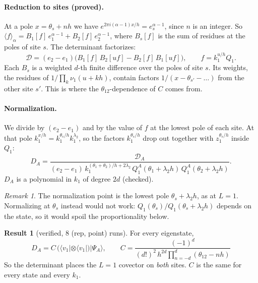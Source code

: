 \documentclass[11pt]{article}
\theoremstyle{definition}
\newtheorem{result}{Result}
\theoremstyle{remark}
\newtheorem*{remark}{Remark}
\begin{document}
\paragraph{Reduction to sites (proved).}
At a pole $x=\theta_s+nh$ we have $e^{2\pi i(\alpha-1)x/h}=e_s^{\alpha-1}$, since $n$ is an integer. So $\langle f\rangle_\alpha=B_1[f]\,e_1^{\alpha-1}+B_2[f]\,e_2^{\alpha-1}$, where $B_s[f]$ is the sum of residues at the poles of site $s$. The determinant factorizes:
\begin{equation}
\mathcal D=(e_2-e_1)\big(B_1[f]\,B_2[uf]-B_2[f]\,B_1[uf]\big),\qquad f=k_1^{u/h}Q_1 .
\end{equation}
Each $B_s$ is a weighted $d$-th finite difference over the poles of site $s$. Its weights, the residues of $1/\prod_k\nu_1(u+kh)$, contain factors $1/(x-\theta_{s'}-\dots)$ from the other site $s'$. This is where the $\theta_{12}$-dependence of $C$ comes from.

\paragraph{Normalization.}
We divide by $(e_2-e_1)$ and by the value of $f$ at the lowest pole of each site. At that pole $k_1^{x/h}=k_1^{\theta_s/h}k_1^{\lambda_2}$, so the factors $k_1^{\theta_s/h}$ drop out together with $z_1^{\theta_s/h}$ inside $Q_1$:
\begin{equation}
D_A=\frac{\mathcal D_A}{(e_2-e_1)\,k_1^{(\theta_1+\theta_2)/h+2\lambda_2}\,Q^A_1(\theta_1+\lambda_2h)\,Q^A_1(\theta_2+\lambda_2h)} .
\end{equation}
$D_A$ is a polynomial in $k_1$ of degree $2d$ (checked).

\begin{remark}
The normalization point is the lowest pole $\theta_s+\lambda_2h$, as at $L=1$. Normalizing at $\theta_s$ instead would not work: $Q_1(\theta_s)/Q_1(\theta_s+\lambda_2h)$ depends on the state, so it would spoil the proportionality below.
\end{remark}

\begin{result}[verified, 8 (rep, point) runs]\label{res:det}
For every eigenstate,
\begin{equation}
\boxed{\;D_A=C\,\big(\langle v_1|\otimes\langle v_1|\big)|\Psi_A\rangle,\qquad C=\frac{(-1)^d}{(d!)^2\,h^{2d}\prod_{n=-d}^{d}(\theta_{12}-nh)}\;}
\end{equation}
So the determinant places the $L=1$ covector on \emph{both} sites. $C$ is the same for every state and every $k_1$.
\end{result}
\end{document}
